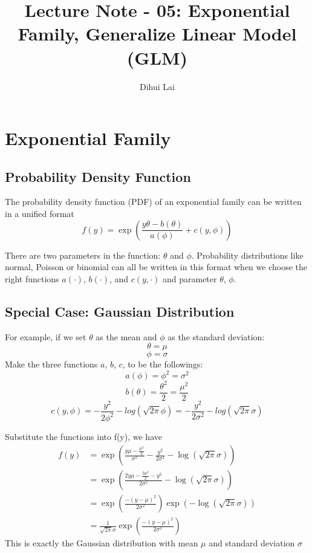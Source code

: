 \documentclass[12pt, oneside]{article}
\title{Lecture Note - 05: Exponential Family, Generalize Linear Model (GLM)}
\author{Dihui Lai}
\begin{document}
\maketitle
\tableofcontents

\vspace{.25in}

\section{Exponential Family }

\subsection{Probability Density Function}
The probability density function (PDF) of an exponential family can be written in a unified format
$$
{f(y)}=\exp{\left( \frac{y\theta-b(\theta)}{a(\phi)}+c(y, \phi)\right)}
$$

There are two parameters in the function: $\theta$ and $\phi$. Probability distributions like normal, Poisson or binomial can all be written in this format when we choose the right functions $a(\cdot)$, $b(\cdot)$, and $c(y, \cdot)$ and parameter $\theta$,  $\phi$. 

\subsection{Special Case: Gaussian Distribution}
For example, if we set $\theta$ as the mean and $\phi$ as the standard deviation:
$$\theta=\mu$$
$$\phi=\sigma$$
Make the three functions $a$, $b$, $c$, to be the followings:
$$a(\phi)=\phi^2=\sigma^2$$
$$b(\theta)=\frac{\theta^2}{2}=\frac{\mu^2}{2}$$
$$c(y,\phi)=-\frac{y^2}{2\phi^2}-log(\sqrt{2\pi}\phi)=-\frac{y^2}{2\sigma^2}-log(\sqrt{2\pi}\sigma)$$

Substitute the functions into f(y), we have 
\begin{align*}
{f(y)}
&=\exp{\left( \frac{y\mu-\frac{\mu^2}{2}}{\sigma^2}-\frac{y^2}{2\sigma^2}-\log(\sqrt{2\pi}\sigma)\right)}\\
&=\exp{\left( \frac{2y\mu-\frac{2\mu^2}{2}-y^2}{2\sigma^2}-\log(\sqrt{2\pi}\sigma)\right)}\\
&=\exp{\left( \frac{-(y-\mu)^2}{2\sigma^2}\right)\exp(-\log(\sqrt{2\pi}\sigma))}\\
&=\frac{1}{\sqrt{2\pi}\sigma}\exp{\left( \frac{-(y-\mu)^2}{2\sigma^2}\right)}
\end{align*}
This is exactly the Gaussian distribution with mean $\mu$ and standard deviation $\sigma$
\end{document}
